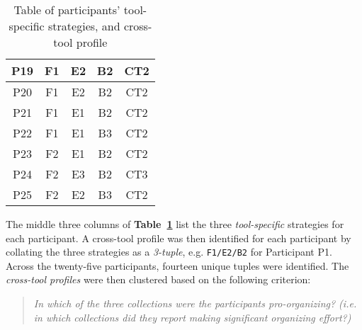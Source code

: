 \begin{table}[btp]
\begin{center}
\begin{footnotesize}
\begin{tabular}{|c|c|c|c|c|}
\hline
        P19 &         F1 &         E2 &         B2 &        CT2 \\
\hline
        P20 &         F1 &         E2 &         B2 &        CT2 \\
\hline
        P21 &         F1 &         E1 &         B2 &        CT2 \\
\hline
        P22 &         F1 &         E1 &         B3 &        CT2 \\
\hline
        P23 &         F2 &         E1 &         B2 &        CT2 \\
\hline
        P24 &         F2 &         E3 &         B2 &        CT3 \\
\hline
        P25 &         F2 &         E2 &         B3 &        CT2 \\
\hline
\end{tabular}  
\end{footnotesize}
\caption{Table of participants' tool-specific strategies, and cross-tool profile}
\label{table:exp-study:tool-specific-classifications}
\end{center}
\end{table}
\normalsize

The middle three columns of \textbf{Table~\ref{table:exp-study:tool-specific-classifications}} list the three \textit{tool-specific} strategies for each participant.  A cross-tool profile was then identified for each participant by collating the three strategies as a \textit{3-tuple}, e.g. \texttt{F1/E2/B2} for Participant P1. Across the twenty-five participants, fourteen unique tuples were identified.
The \textit{cross-tool profiles} were then clustered based on the following criterion:
\begin{quote}
\textit{In which of the three collections were the participants pro-organizing? (i.e. in which collections did they report making significant organizing effort?)}
\end{quote}

